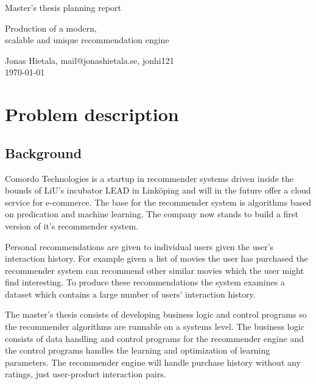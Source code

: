 \documentclass[11pt]{article}
\begin{document}
\begin{center}


{ \Large Master's thesis planning report\\[0.5cm] }

{ \LARGE Production of a modern, \\scalable and unique recommendation engine \\[0.4cm] }

Jonas Hietala, mail@jonashietala.se, jonhi121 \\[0.2cm]

\today

\end{center}


\section*{Problem description}

\subsection*{Background}

Comordo Technologies is a startup in recommender systems driven inside the bounds of LiU's incubator LEAD in Linköping and will in the future offer a cloud service for e-commerce. The base for the recommender system is algorithms based on predication and machine learning. The company now stands to build a first version of it's recommender system.

Personal recommendations are given to individual users given the user's interaction history. For example given a list of movies the user has purchased the recommender system can recommend other similar movies which the user might find interesting. To produce these recommendations the system examines a dataset which contains a large number of users' interaction history.

The master's thesis consists of developing business logic and control programs so the recommender algorithms are runnable on a systems level. The business logic consists of data handling and control programs for the recommender engine and the control programs handles the learning and optimization of learning parameters. The recommender engine will handle purchase history without any ratings, just user-product interaction pairs.
\end{document}
